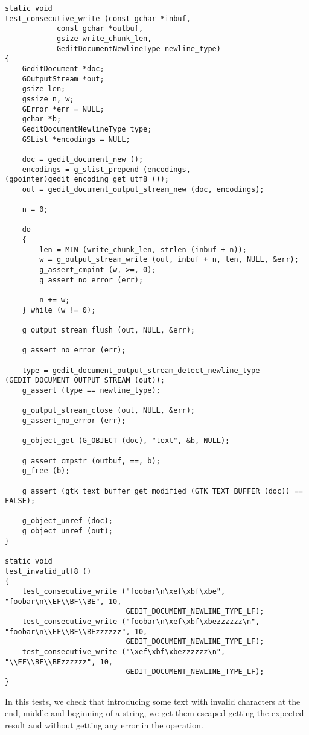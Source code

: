 \begin{lstlisting}[style=GObject]
static void
test_consecutive_write (const gchar *inbuf,
			const gchar *outbuf,
			gsize write_chunk_len,
			GeditDocumentNewlineType newline_type)
{
	GeditDocument *doc;
	GOutputStream *out;
	gsize len;
	gssize n, w;
	GError *err = NULL;
	gchar *b;
	GeditDocumentNewlineType type;
	GSList *encodings = NULL;

	doc = gedit_document_new ();
	encodings = g_slist_prepend (encodings, (gpointer)gedit_encoding_get_utf8 ());
	out = gedit_document_output_stream_new (doc, encodings);

	n = 0;

	do
	{
		len = MIN (write_chunk_len, strlen (inbuf + n));
		w = g_output_stream_write (out, inbuf + n, len, NULL, &err);
		g_assert_cmpint (w, >=, 0);
		g_assert_no_error (err);

		n += w;
	} while (w != 0);

	g_output_stream_flush (out, NULL, &err);

	g_assert_no_error (err);

	type = gedit_document_output_stream_detect_newline_type (GEDIT_DOCUMENT_OUTPUT_STREAM (out));
	g_assert (type == newline_type);

	g_output_stream_close (out, NULL, &err);
	g_assert_no_error (err);

	g_object_get (G_OBJECT (doc), "text", &b, NULL);

	g_assert_cmpstr (outbuf, ==, b);
	g_free (b);

	g_assert (gtk_text_buffer_get_modified (GTK_TEXT_BUFFER (doc)) == FALSE);

	g_object_unref (doc);
	g_object_unref (out);
}

static void
test_invalid_utf8 ()
{
	test_consecutive_write ("foobar\n\xef\xbf\xbe", "foobar\n\\EF\\BF\\BE", 10,
	                        GEDIT_DOCUMENT_NEWLINE_TYPE_LF);
	test_consecutive_write ("foobar\n\xef\xbf\xbezzzzzz\n", "foobar\n\\EF\\BF\\BEzzzzzz", 10,
	                        GEDIT_DOCUMENT_NEWLINE_TYPE_LF);
	test_consecutive_write ("\xef\xbf\xbezzzzzz\n", "\\EF\\BF\\BEzzzzzz", 10,
	                        GEDIT_DOCUMENT_NEWLINE_TYPE_LF);
}
\end{lstlisting}

In this tests, we check that introducing some text with invalid characters at the end, middle and beginning of a string, we get them escaped getting the expected result and without getting any error in the operation.
